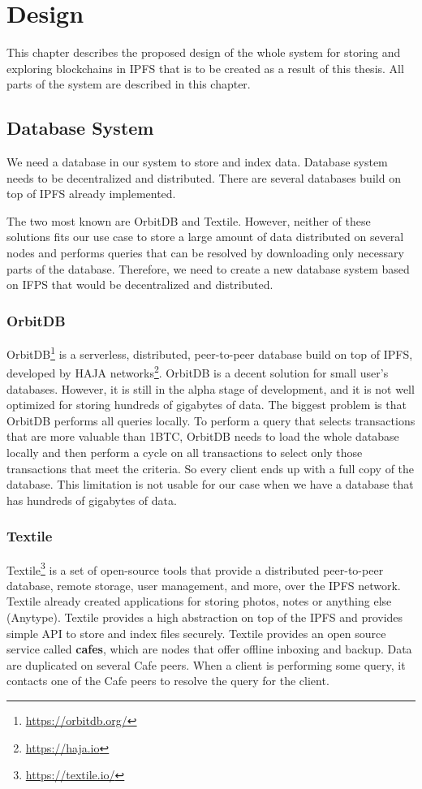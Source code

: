 \chapter{Design}
\label{Design}
This chapter describes the proposed design of the whole system for storing and exploring blockchains in IPFS that is to be created as a result of this thesis. All parts of the system are described in this chapter.

\section{Database System}
We need a database in our system to store and index data. Database system needs to be decentralized and distributed. There are several databases build on top of IPFS already implemented. 

The two most known are OrbitDB and Textile. However, neither of these solutions fits our use case to store a large amount of data distributed on several nodes and performs queries that can be resolved by downloading only necessary parts of the database. Therefore, we need to create a new database system based on IFPS that would be decentralized and distributed. 

\subsection{OrbitDB}
OrbitDB\footnote{\url{https://orbitdb.org/}} \cite{OrbitDBManual} is a serverless, distributed, peer-to-peer database build on top of IPFS, developed by HAJA networks\footnote{\url{https://haja.io}}. OrbitDB is a decent solution for small user's databases. However, it is still in the alpha stage of development, and it is not well optimized for storing hundreds of gigabytes of data. The biggest problem is that OrbitDB performs all queries locally. To perform a query that selects transactions that are more valuable than 1BTC, OrbitDB needs to load the whole database locally and then perform a cycle on all transactions to select only those transactions that meet the criteria. So every client ends up with a full copy of the database. This limitation is not usable for our case when we have a database that has hundreds of gigabytes of data.

\subsection{Textile}
Textile\footnote{\url{https://textile.io/}} is a set of open-source tools that provide a distributed peer-to-peer database, remote storage, user management, and more, over the IPFS network. Textile already created applications for storing photos, notes or anything else (Anytype). Textile provides a high abstraction on top of the IPFS and provides simple API to store and index files securely. Textile provides an open source service called \textbf{cafes}, which are nodes that offer offline inboxing and backup. Data are duplicated on several Cafe peers. When a client is performing some query, it contacts one of the Cafe peers to resolve the query for the client. 
\cite{TextileWhitePaper}

